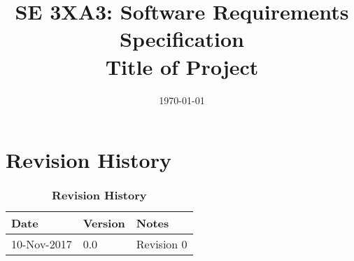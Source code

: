 \documentclass[12pt, titlepage]{article}
\title{SE 3XA3: Software Requirements Specification\\Title of Project}
\date{\today}
\newcommand{\revisionTable}{
	\begin{table}[hp]
		
		\begin{tabularx}{\textwidth}{p{3cm}p{2cm}X}
			\toprule {\bf Date} & {\bf Version} & {\bf Notes}\\
			\midrule
			
			10-Nov-2017 & 0.0 & Revision 0\\
			
			\bottomrule
		\end{tabularx}
		\caption{\bf Revision History}
	\end{table}
}
\begin{document}
%
%
%
%








\def\thesection{\arabic{section}} 
\renewcommand\thesection{\arabic{section}} 
\renewcommand\thesubsection{\thesection.\arabic{subsection}}

\tableofcontents

\listoftables

\listoffigures


\newpage

\section{Revision History}
\revisionTable


\end{document}
